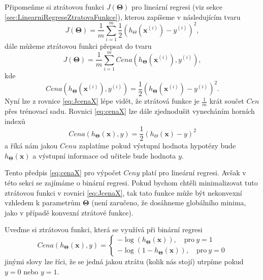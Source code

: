 \par{Připomeňme si ztrátovou funkci $J \left( \bm{\Theta} \right)$ pro lineární regresi (viz sekce \ref{sec:LinearniRegreseZtratovaFunkce}), kterou zapíšeme v následujícím tvaru
\begin{equation}
	J \left( \bm{\Theta} \right) = \frac{1}{m} \sum_{i=1}^{m} \frac{1}{2} \left( h_{\Theta} \left( \bm{x}^{\left( i \right)} \right) - y^{\left( i \right)} \right)^2,
\end{equation}
dále můžeme ztrátovou funkci přepsat do tvaru
\begin{equation}
	J \left( \bm{\Theta} \right) = \frac{1}{m} \sum_{i=1}^{m} Cena \left( h_{\bm{\Theta}} \left( \bm{x}^{\left( i \right)} \right), y^{\left( i \right)} \right),
	\label{eq:JcenaX}
\end{equation}
kde
\begin{equation}
	Cena \left( h_{\bm{\Theta}} \left( \bm{x}^{\left( i \right)} \right), y^{\left( i \right)} \right) = \frac{1}{2} \left( h_{\bm{\Theta}} \left( \bm{x}^{\left( i \right)} \right) - y^{\left( i \right)} \right)^2.
	\label{eq:cenaX}	
\end{equation}
Nyní lze z rovnice \ref{eq:JcenaX} lépe vidět, že ztrátová funkce je $\frac{1}{m}$ krát součet $Cen$ přes trénovací sadu. Rovnici \ref{eq:cenaX} lze dále zjednodušit vynecháním horních indexů
\begin{equation}
	Cena \left( h_{\bm{\Theta}} \left( \bm{x} \right), y \right) = \frac{1}{2} \left( h_{\Theta} \left( \bm{x} \right) - y \right)^2
\end{equation}
a říká nám jakou $Cenu$ zaplatíme pokud výstupní hodnota hypotézy bude $h_{\bm{\Theta}} \left( \bm{x} \right)$ a výstupní informace od učitele bude hodnota $y$.}

\par{Tento předpis \ref{eq:cenaX} pro výpočet $Ceny$ platí pro lineární regresi. Avšak v této sekci se zajímáme o binární regresi. Pokud bychom chtěli minimalizovat tuto ztrátovou funkci v rovnici \ref{eq:JcenaX}, tak tato funkce může být nekonvexní vzhledem k parametrům $\bm{\Theta}$ (není zaručeno, že dosáhneme globálního minima, jako v případě konvexní ztrátové funkce).}

\par{Uveďme si ztrátovou funkci, která se využívá při binární regresi
\begin{equation}
	\label{eq:ztratovaFunkceBinarniRegrese}
	Cena \left( h_{\bm{\Theta}} \left( \bm{x} \right), y \right) = \left\{
	\begin{array}{r}
		{- \log \left( h_{\bm{\Theta}} \left( \bm{x} \right) \right), \quad \textrm{pro}~y = 1} \\
		{- \log \left( 1 - h_{\bm{\Theta}} \left( \bm{x} \right) \right), \quad \textrm{pro}~y = 0}
	\end{array}
	\right.
\end{equation}
jinými slovy lze říci, že se jedná jakou ztrátu (kolik nás stojí) utrpíme pokud $y = 0$ nebo $y = 1$.}


